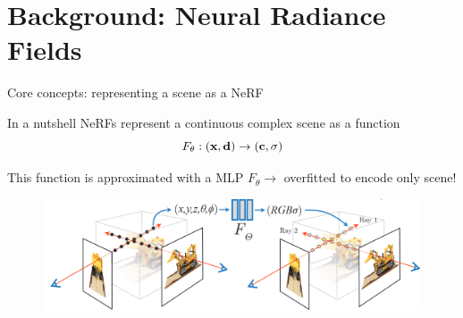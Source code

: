 \documentclass[aspectratio=1610]{beamer}
\begin{document}
\section{Background: Neural Radiance Fields}
\begin{frame}{Core concepts: representing a scene as a NeRF}
    \begin{block}{In a nutshell}
        NeRFs represent a continuous complex scene as a function 
        \begin{equation*}
            F_\theta : (\vb{x}, \vb{d}) \rightarrow (\vb{c}, \sigma)
        \end{equation*}
    \end{block}
    This function is approximated with a MLP \(F_\theta \rightarrow\)  overfitted to encode only scene!
    \bigskip
    \begin{figure}[H]
        \centering
        \includegraphics[width=.7\textwidth,keepaspectratio]{mapping}
    \end{figure}
\end{frame}
\end{document}

